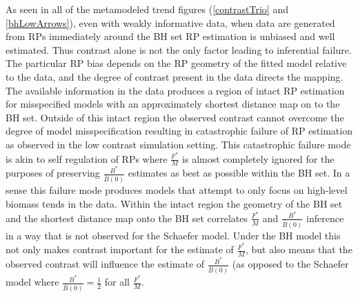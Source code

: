 As seen in all of the metamodeled trend figures (\ref{contrastTrio} and \ref{bhLowArrows}), 
even with weakly informative data, when data are generated from RPs immediately around the BH set %
RP estimation is unbiased and well estimated. Thus contrast 
alone is not the only factor leading to inferential failure. The particular RP 
bias depends on the RP geometry of the fitted model relative to the data, and 
the degree of contrast present in the data directs the mapping. 
The available information in the data produces a region of intact RP estimation 
for misspecified models with an approximately shortest distance map on to the BH set. 
Outside of this intact region the observed contrast cannot overcome the degree 
of model misspecification resulting in catastrophic failure of RP estimation as 
observed in the low contrast simulation setting.  
This catastrophic failure mode is akin to self regulation of RPs where $\frac{F^*}{M}$ 
is almost completely ignored for the purposes of preserving $\frac{B^*}{\bar B(0)}$ 
estimates as best as possible within the BH set. In a sense this failure mode produces 
models that attempt to only focus on high-level biomass tends in the data.
%
Within the intact region the geometry of the BH set and the shortest distance map onto the BH set 
correlates $\frac{F^*}{M}$ and $\frac{B^*}{\bar B(0)}$ inference in a way that is 
not observed for the Schaefer model.
Under the BH model this not only makes contrast important for the estimate of $\frac{F^*}{M}$, 
but also means that the observed contrast will influence the estimate of 
$\frac{B^*}{\bar B(0)}$ (as opposed to the Schaefer model where $\frac{B^*}{\bar B(0)}=\frac{1}{2}$ for all $\frac{F^*}{M}$. %


